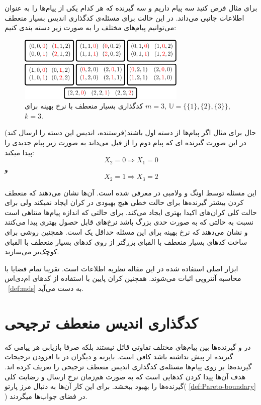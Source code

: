 برای مثال فرض کنید سه پیام داریم و سه گیرنده که هر کدام یکی از پیام‌ها را به عنوان اطلاعات جانبی می‌داند. در این حالت برای مسئله‌ی کدگذاری اندیس بسیار منعطف می‌توانیم پیام‌های مختلف را به صورت زیر دسته بندی کنیم:
\begin{figure}[H]
	\centering
	\includegraphics[width=8cm]{figs/chapter4/Alpha3}
	\caption{
		کدگذاری بسیار منعطف با نرخ بهینه برای
		$m=3$, 
		$\mathbb{U} = \big\{ \{1\}, \{2\}, \{3\} \big\}$,
		$k=3$.
	}
	\label{fig:eg:0}
\end{figure}
حال برای مثال اگر پیام‌ها از دسته اول باشند(فرستنده، اندیس این دسته را ارسال کند) در این صورت گیرنده ای که پیام دوم را از قبل می‌داند به صورت زیر پیام جدیدی را پیدا میکند:
$$X_2 = 0 \Rightarrow X_1 = 0$$
و
$$X_2 = 1 \Rightarrow X_3 = 2$$


این مسئله توسط اونگ و ولامبی در
\cite{verypliable}
معرفی شده است. آن‌ها نشان می‌دهند که منعطف کردن بیشتر گیرنده‌ها برای حالت خطی هیچ بهبودی در کران ایجاد نمیکند ولی برای حالت کلی کران‌های اکیدا بهتری ایجاد می‌کند. برای حالتی که اندازه پیام‌ها متناهی است نسبت به حالتی که به صورت حدی بزرگ باشد نرخ‌های قابل حصول بهتری پیدا می‌کنند و  نشان می‌دهند که نرخ بهینه برای این مسئله حداقل یک است. همچنین روشی برای ساخت کدهای بسیار منعطف با الفبای بزرگتر از روی کدهای بسیار منعطف با الفبای کوچک‌تر می‌سازند.

ابزار اصلی استفاده شده در این مقاله نظریه اطلاعات است. تقریبا تمام قضایا با محاسبه آنتروپی اثبات می‌شوند. همچنین کران پایین با استفاده از
 کدهای ام‌دی‌اس
 ~\autoref{def:mds}
به دست می‌آید.


\section{کدگذاری اندیس منعطف ترجیحی}
در 
\icod
 و 
 \picod
 گیرنده‌ها بین پیام‌های مختلف تفاوتی قائل نیستند بلکه صرفا بازیابی هر پیامی که گیرنده از پیش نداشته باشد کافی است. بایرنه و دیگران در
\cite{byrne2023preferential}
با افزودن ترجیحات گیرنده‌ها بر روی پیام‌ها مسئله‌ی کدگذاری اندیس منعطف ترجیحی را تعریف کرده اند. هدف آن‌ها پیدا کردن کدهایی است که به صورت هم‌زمان نرخ ارسال و رضایت کلی گیرنده‌ها را بهبود ببخشد. برای این کار آن‌ها به دنبال مرز پارتو(
\autoref{def:Pareto-boundary}
)
 در فضای جواب‌ها میگردند.
 
